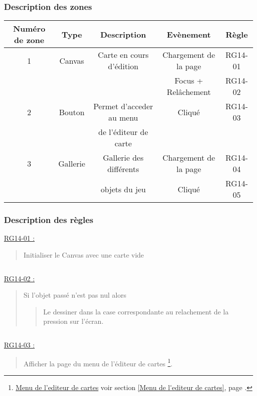 \documentclass{report}
\begin{document}
		\subsubsection{Description des zones}
		
			\begin{tabular}{|c|c|c|c|c|} \hline
				Numéro de zone & Type  & Description & Evènement &	Règle \\\hline
				1 & Canvas   & Carte en cours d'édition & Chargement de la page & RG14-01 \\
				  &          &                          & Focus + Relâchement & RG14-02 \\\hline
				2 & Bouton   & Permet d'acceder au menu & Cliqué & RG14-03 \\
				  &          & de l'éditeur de carte    &        &         \\\hline
				3 & Gallerie & Gallerie des différents  & Chargement de la page & RG14-04 \\
				  &          & objets du jeu            & Cliqué                & RG14-05 \\\hline
			\end{tabular}
			
		\subsubsection{Description des règles}

			\underline{RG14-01 :}
				\begin{quote}
				Initialiser le Canvas avec une carte vide
				\end{quote}
				
			$\,$
			
			\underline{RG14-02 :}
				\begin{quote}
				Si l'objet passé n'est pas nul alors
					\begin{quote}
					Le dessiner dans la case correspondante au relachement de la pression sur l'écran.
					\end{quote}
				\end{quote}
				
			$\,$
			
			\underline{RG14-03 :}
				\begin{quote}
				Afficher la page du menu de l'éditeur de cartes
				\footnote[1]{
						\hyperlink{Menu de l'editeur de cartes}{Menu de l'editeur de cartes}
						\og voir section \ref{Menu de l'editeur de cartes}, page \pageref{Menu de l'editeur de cartes}.\fg
				}.
				\end{quote}
				
\end{document}
